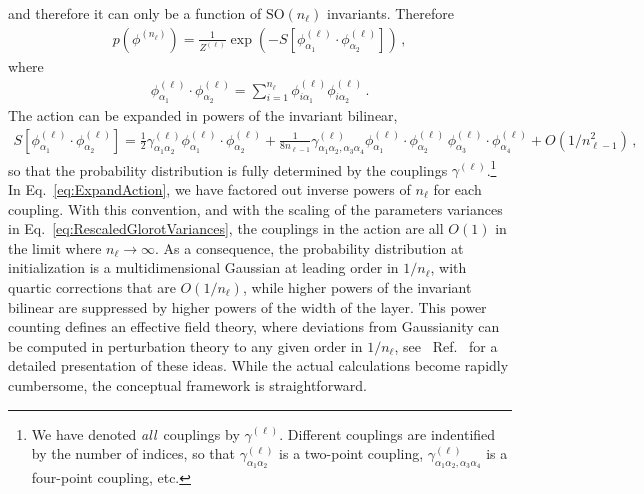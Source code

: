 and therefore it can only be a function of $\text{SO}(n_{\ell})$ invariants. Therefore
\begin{align}
    \label{eq:PriorAction}
    p\left(\phi^{(n_\ell)}\right) =
        \frac{1}{Z^{(\ell)}} \exp\left(-S\left[\phi^{(\ell)}_{\alpha_1}
            \cdot \phi^{(\ell)}_{\alpha_2}\right]\right)\, ,
\end{align}
where
\begin{align}
    \label{eq:PhiInvariant}
    \phi^{(\ell)}_{\alpha_1}
            \cdot \phi^{(\ell)}_{\alpha_2} =
    \sum_{i=1}^{n_\ell} \phi^{(\ell)}_{i \alpha_1} \phi^{(\ell)}_{i \alpha_2}\, .
\end{align}
The action can be expanded in powers of the invariant bilinear,
\begin{align}
    \label{eq:ExpandAction}
    S\left[\phi^{(\ell)}_{\alpha_1}
            \cdot \phi^{(\ell)}_{\alpha_2}\right] =
        \frac12 \gamma^{(\ell)}_{\alpha_1\alpha_2}
            \phi^{(\ell)}_{\alpha_1} \cdot \phi^{(\ell)}_{\alpha_2} +
            \frac{1}{8 n_{\ell-1}} \gamma^{(\ell)}_{\alpha_1\alpha_2,\alpha_3\alpha_4}
            \phi^{(\ell)}_{\alpha_1} \cdot \phi^{(\ell)}_{\alpha_2} \,
            \phi^{(\ell)}_{\alpha_3} \cdot \phi^{(\ell)}_{\alpha_4} + O(1/n_{\ell-1}^2)\, ,
\end{align}
so that the probability distribution is fully determined by the couplings 
$\gamma^{(\ell)}$.\footnote{
    We have denoted {\em all}\ couplings by $\gamma^{{(\ell)}}$. Different couplings 
    are indentified by the number of indices, so that $\gamma^{(\ell)}_{\alpha_1\alpha_2}$ 
    is a two-point coupling, $\gamma^{(\ell)}_{\alpha_1\alpha_2,\alpha_3\alpha_4}$ is a four-point 
    coupling, etc. 
} 
In
Eq.~\eqref{eq:ExpandAction}, we have factored out inverse powers of $n_\ell$ for each coupling.
With this convention, and with the scaling of the parameters variances in
Eq.~\eqref{eq:RescaledGlorotVariances}, the couplings in the action are all $O(1)$
in the limit where $n_\ell\to\infty$.
As a consequence, the probability distribution at initialization is a multidimensional Gaussian at
leading order in $1/n_\ell$, with quartic corrections that are $O(1/n_\ell)$, while higher powers
of the invariant bilinear are suppressed by higher powers of the width of the layer. This power counting
defines an effective field theory, where deviations from Gaussianity can be computed in perturbation
theory to any given order in $1/n_\ell$, see \eg\ Ref.~\cite{Roberts:2021fes} for a detailed
presentation of these ideas. While the actual calculations become rapidly cumbersome, the
conceptual framework is straightforward.


